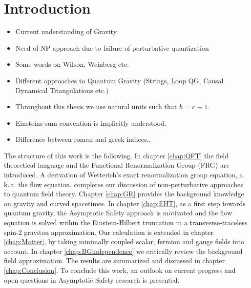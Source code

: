 \chapter{Introduction}
\begin{itemize}
	\item Current understanding of Gravity
	\item Need of NP approach due to failure of perturbative quantization
	\item Some words on Wilson, Weinberg etc.
	\item Different approaches to Quantum Gravity (Strings, Loop QG, Causal Dynamical Triangulations etc.)
	\item Throughout this thesis we use natural units such that $\hbar = c  \equiv 1$.
	\item Einsteins sum convention is implicitly understood.
	\item Difference between roman and greek indices..
\end{itemize}

The structure of this work is the following. In chapter \ref{chap:QFT} the field theoretical language and the Functional Renormalization Group (FRG) are introduced. A derivation of Wetterich's exact renormalization group equation, a.\,k.\,a. the flow equation,  completes our discussion of non-perturbative approaches to quantum field theory. Chapter \ref{chap:GR} provides the background knowledge on gravity and curved spacetimes. In chapter \ref{chap:EHT}, as a first step towards quantum gravity, the Asymptotic Safety approach is motivated and the flow equation is solved within the Einstein-Hilbert truncation in a transverse-traceless spin-2 graviton approximation. Our calculation is extended in chapter \ref{chap:Matter}, by taking minimally coupled scalar, fermion and gauge fields into account. In chapter \ref{chap:BGindependence} we critically review the background field approximation.
The results are summarized and discussed in chapter \ref{chap:Conclusion}. To conclude this work, an outlook on current progress and open questions in Asymptotic Safety research is presented.